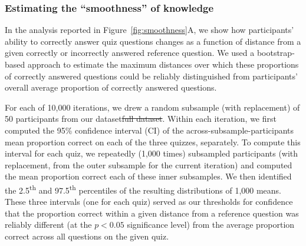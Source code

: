 \documentclass[10pt]{article}
\providecommand{\DIFaddtex}[1]{{\protect\color{blue}\uwave{#1}}} %
\providecommand{\DIFdeltex}[1]{{\protect\color{red}\sout{#1}}}                      %
\providecommand{\DIFaddbegin}{} %
\providecommand{\DIFaddend}{} %
\providecommand{\DIFdelbegin}{} %
\providecommand{\DIFdelend}{} %
\providecommand{\DIFadd}[1]{\texorpdfstring{\DIFaddtex{#1}}{#1}} %
\providecommand{\DIFdel}[1]{\texorpdfstring{\DIFdeltex{#1}}{}} %
\newcommand{\DIFscaledelfig}{0.5}
\newlength{\DIFdelgraphicswidth} %
\newlength{\DIFdelgraphicsheight} %
\newcommand{\DIFaddincludegraphics}[2][]{{\color{blue}\fbox{\DIFOincludegraphics[#1]{#2}}}} %
\newcommand{\DIFdelincludegraphics}[2][]{%
\sbox{\DIFdelgraphicsbox}{\DIFOincludegraphics[#1]{#2}}%
\settoboxwidth{\DIFdelgraphicswidth}{\DIFdelgraphicsbox} %
\settoboxtotalheight{\DIFdelgraphicsheight}{\DIFdelgraphicsbox} %
\scalebox{\DIFscaledelfig}{%
\parbox[b]{\DIFdelgraphicswidth}{\usebox{\DIFdelgraphicsbox}\\[-\baselineskip] \rule{\DIFdelgraphicswidth}{0em}}\llap{\resizebox{\DIFdelgraphicswidth}{\DIFdelgraphicsheight}{%
\setlength{\unitlength}{\DIFdelgraphicswidth}%
\begin{picture}(1,1)%
\thicklines\linethickness{2pt} %
{\color[rgb]{1,0,0}\put(0,0){\framebox(1,1){}}}%
{\color[rgb]{1,0,0}\put(0,0){\line( 1,1){1}}}%
{\color[rgb]{1,0,0}\put(0,1){\line(1,-1){1}}}%
\end{picture}%
}\hspace*{3pt}}} %
} %
\DeclareRobustCommand{\DIFaddbegin}{\DIFOaddbegin \let\includegraphics\DIFaddincludegraphics} %
\DeclareRobustCommand{\DIFaddend}{\DIFOaddend \let\includegraphics\DIFOincludegraphics} %
\DeclareRobustCommand{\DIFdelbegin}{\DIFOdelbegin \let\includegraphics\DIFdelincludegraphics} %
\DeclareRobustCommand{\DIFdelend}{\DIFOaddend \let\includegraphics\DIFOincludegraphics} %
\begin{document}

\DIFaddend \subsubsection*{Estimating the ``smoothness'' of knowledge}\label{subsec:smoothness}

In the analysis reported in Figure~\ref{fig:smoothness}A, we show how
participants' ability to correctly answer quiz questions changes as a function
of distance from a given correctly or incorrectly answered reference question.
We used a bootstrap-based approach to estimate the maximum distances over which
these proportions of correctly answered questions could be reliably
distinguished from participants' overall average proportion of correctly
answered questions.

For each of 10,000 iterations, we drew a random subsample (with replacement) of
50 participants from our dataset\DIFdelbegin \DIFdel{full dataset}\DIFdelend . Within each iteration, we first computed the
95\% confidence interval (CI) of the across-subsample-participants mean
proportion correct on each of the three quizzes, separately. To compute this
interval for each quiz, we repeatedly (1,000 times) subsampled participants
(with replacement, from the outer subsample for the current iteration) and
computed the mean proportion correct \DIFaddbegin \DIFadd{of }\DIFaddend each of these inner subsamples. We then
identified the 2.5\textsuperscript{th} and 97.5\textsuperscript{th} percentiles
of the resulting distributions of 1,000 means. These three intervals (one for
each quiz) served as our thresholds for confidence that the proportion correct
within a given distance from a reference question was reliably different (at
the $p < 0.05$ significance level) from the average proportion correct across
all questions on the given quiz.
\end{document}

